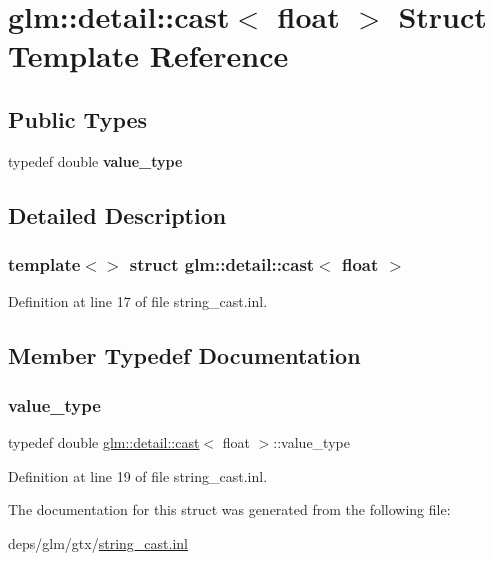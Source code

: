 \hypertarget{structglm_1_1detail_1_1cast_3_01float_01_4}{}\section{glm\+:\+:detail\+:\+:cast$<$ float $>$ Struct Template Reference}
\label{structglm_1_1detail_1_1cast_3_01float_01_4}
\subsection*{Public Types}
\begin{DoxyCompactItemize}
\item 
\mbox{\label{structglm_1_1detail_1_1cast_3_01float_01_4_ada0eba4cef43496c87fbb3e3e42f1541}} 
typedef double {\bfseries value\+\_\+type}
\end{DoxyCompactItemize}


\subsection{Detailed Description}
\subsubsection*{template$<$$>$\newline
struct glm\+::detail\+::cast$<$ float $>$}



Definition at line 17 of file string\+\_\+cast.\+inl.



\subsection{Member Typedef Documentation}
\mbox{\label{structglm_1_1detail_1_1cast_3_01float_01_4_ada0eba4cef43496c87fbb3e3e42f1541}} 
\subsubsection{\texorpdfstring{value\+\_\+type}{value\_type}}
{\footnotesize\ttfamily typedef double \hyperlink{structglm_1_1detail_1_1cast}{glm\+::detail\+::cast}$<$ float $>$\+::value\+\_\+type}



Definition at line 19 of file string\+\_\+cast.\+inl.



The documentation for this struct was generated from the following file\+:\begin{DoxyCompactItemize}
\item 
deps/glm/gtx/\hyperlink{string__cast_8inl}{string\+\_\+cast.\+inl}\end{DoxyCompactItemize}
